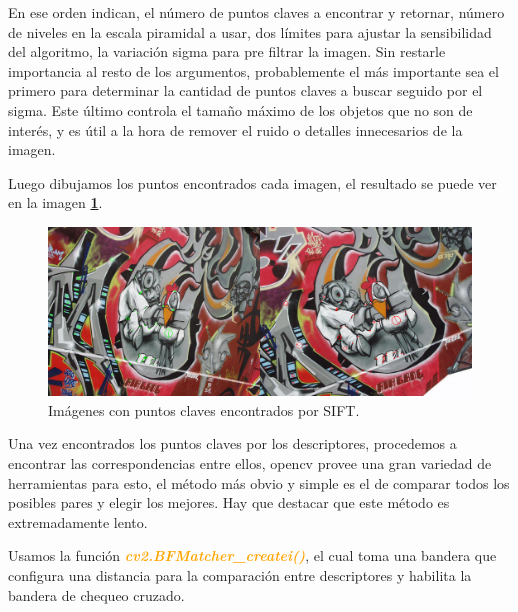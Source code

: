 \documentclass[11pt, a4paper]{article}
\begin{document}
	En ese orden indican, el número de puntos claves a encontrar y retornar, número de niveles en la escala piramidal a usar, dos límites para ajustar la sensibilidad del algoritmo, la variación sigma para pre filtrar la imagen. Sin restarle importancia al resto de los argumentos, probablemente el más importante sea el primero para determinar la cantidad de puntos claves a buscar seguido por el sigma. Este último controla el tamaño máximo de los objetos que no son de interés, y es útil a la hora de remover el ruido o detalles innecesarios de la imagen. 
	
	

	Luego dibujamos los puntos encontrados cada imagen, el resultado se puede ver en la imagen \textcolor{blue}{\textbf{\ref{fig:sift_kp}}}.
	

	\begin{figure}[H]
		\centering
		\includegraphics[width=\textwidth]{Imagenes/sift_kp.png}
		\caption{Imágenes con puntos claves encontrados por SIFT.}
		\label{fig:sift_kp}
	\end{figure} 

	Una vez encontrados los puntos claves por los descriptores, procedemos a encontrar las correspondencias entre ellos, opencv provee una gran variedad de herramientas para esto, el método más obvio y simple es el de comparar todos los posibles pares y elegir los mejores. Hay que destacar que este método es extremadamente lento. 

	Usamos la función \textcolor{orange}{\textbf{\textit{cv2.BFMatcher\_createi()}}}, el cual toma una bandera que configura una distancia para la comparación entre descriptores y habilita la bandera de chequeo cruzado.

	
\end{document}

